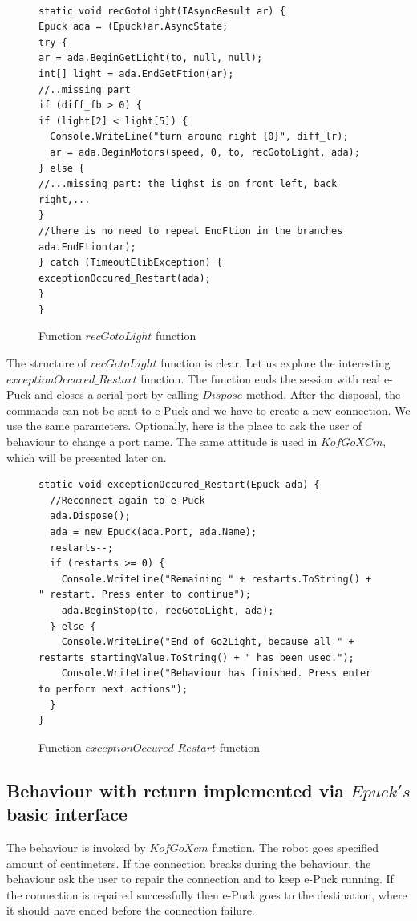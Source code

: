 \begin{figure}[!hbp]
\begin{lstlisting}
  
static void recGotoLight(IAsyncResult ar) {
Epuck ada = (Epuck)ar.AsyncState;
try {
ar = ada.BeginGetLight(to, null, null);
int[] light = ada.EndGetFtion(ar);
//..missing part
if (diff_fb > 0) {
if (light[2] < light[5]) {
  Console.WriteLine("turn around right {0}", diff_lr);
  ar = ada.BeginMotors(speed, 0, to, recGotoLight, ada);
} else {
//...missing part: the lighst is on front left, back right,...
}
//there is no need to repeat EndFtion in the branches
ada.EndFtion(ar);
} catch (TimeoutElibException) {
exceptionOccured_Restart(ada);
}
}
\end{lstlisting}
\caption{Function $recGotoLight$ function} \label{go2light}
\end{figure}
  The structure of $recGotoLight$ function is clear. Let us explore the interesting $exceptionOccured\_Restart$ function.
  The function ends the session with real e-Puck and closes a serial port by calling $Dispose$ method.
  After the disposal, the commands can not be sent to e-Puck and we have to create a new connection. We use the same parameters.
  Optionally, here is the place to ask the user of behaviour to change a port name.
  The same attitude is used in $KofGoXCm$, which will be presented later on.
\begin{figure}[!hbp]
\begin{lstlisting}
static void exceptionOccured_Restart(Epuck ada) {
  //Reconnect again to e-Puck
  ada.Dispose();
  ada = new Epuck(ada.Port, ada.Name);
  restarts--;
  if (restarts >= 0) {
    Console.WriteLine("Remaining " + restarts.ToString() + " restart. Press enter to continue");
    ada.BeginStop(to, recGotoLight, ada);
  } else {
    Console.WriteLine("End of Go2Light, because all " + restarts_startingValue.ToString() + " has been used.");
    Console.WriteLine("Behaviour has finished. Press enter to perform next actions");
  }
}
\end{lstlisting}
\caption{Function $exceptionOccured\_Restart$ function} \label{restart}
\end{figure}

\subsection{Behaviour with return implemented via $Epuck's$ basic interface}\label{sec:kofgoxcm}
  The behaviour is invoked by $KofGoXcm$ function. 
  The robot goes specified amount of centimeters. 
  If the connection breaks during the behaviour, 
  the behaviour ask the user to repair the connection and to keep e-Puck running. 
  If the connection is repaired successfully then e-Puck goes to the destination, 
  where it should have ended before the connection failure.

